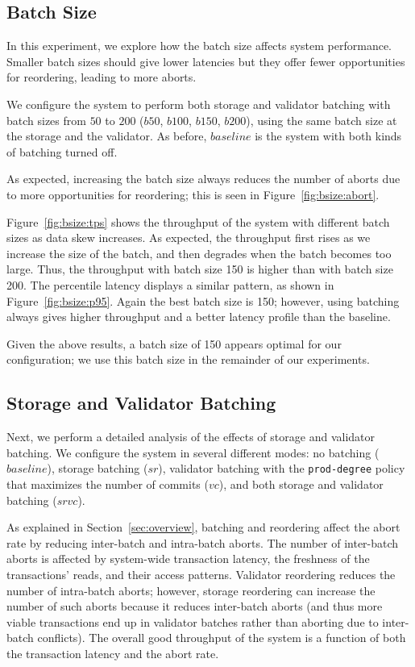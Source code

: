 \subsection{Batch Size}

In this experiment, we explore how the batch size affects system performance. Smaller batch sizes should give lower latencies but they offer fewer opportunities for reordering, leading to more aborts. 

We configure the system to perform both storage and validator batching with batch sizes from $50$ to $200$ ($b50$, $b100$, $b150$, $b200$), using the same batch size at the storage and the validator. As before, $baseline$ is the system with both kinds of batching turned off. 

As expected, increasing the batch size always reduces the number of aborts due to more opportunities for reordering; this is seen in Figure~\ref{fig:bsize:abort}. 

Figure~\ref{fig:bsize:tps} shows the throughput of the system with different batch sizes as data skew increases. As expected, the throughput first rises as we increase the size of the batch, and then degrades when the batch becomes too large. Thus, the throughput with batch size 150 is higher than with batch size 200. The percentile latency displays a similar pattern, as shown in Figure~\ref{fig:bsize:p95}. Again the best batch size is 150; however, using batching always gives higher throughput and a better latency profile than the baseline.



Given the above results, a batch size of 150 appears optimal for our configuration; we use this batch size in the remainder of our experiments. 

\subsection{Storage and Validator Batching}
\label{subsec:experiment:batching}

Next, we perform a detailed analysis of the effects of storage and validator batching. We configure the system in several different modes: no batching ($baseline$), storage batching ($sr$), validator batching with the \texttt{prod-degree} policy that maximizes the number of commits ($vc$), and both storage and validator batching ($srvc$).


As explained in Section~\ref{sec:overview}, batching and reordering affect the abort rate by reducing inter-batch and intra-batch aborts. The number of inter-batch aborts is affected by system-wide transaction latency, the freshness of the transactions' reads, and their access patterns. Validator reordering reduces the number of intra-batch aborts; however, storage reordering can increase the number of such aborts because it reduces inter-batch aborts (and thus more viable transactions end up in validator batches rather than aborting due to inter-batch conflicts). The overall good throughput of the system is a function of both the transaction latency and the abort rate. 


